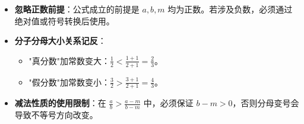\begin{trapbox}
\begin{itemize}
    \item \textbf{忽略正数前提}：公式成立的前提是 $a, b, m$ 均为正数。若涉及负数，必须通过绝对值或符号转换后使用。
    \item \textbf{分子分母大小关系记反}：
    \begin{itemize}
        \item "真分数"加常数变大：$\frac{1}{2} < \frac{1+1}{2+1} = \frac{2}{3}$。
        \item "假分数"加常数变小：$\frac{3}{2} > \frac{3+1}{2+1} = \frac{4}{3}$。
    \end{itemize}
    \item \textbf{减法性质的使用限制}：在 $\frac{a}{b} > \frac{a-m}{b-m}$ 中，必须保证 $b-m > 0$，否则分母变号会导致不等号方向改变。
\end{itemize}
\end{trapbox}